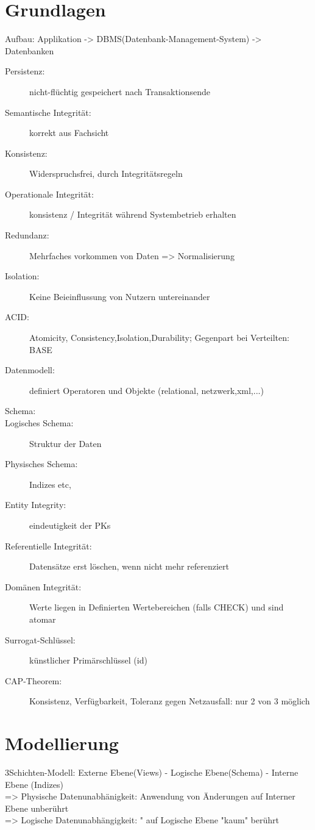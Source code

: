 \section*{Grundlagen}
Aufbau: Applikation -> DBMS(Datenbank-Management-System) -> Datenbanken

\begin{description}
\item[Persistenz:] nicht-flüchtig gespeichert nach Transaktionsende
\item[Semantische Integrität:] korrekt aus Fachsicht 
\item[Konsistenz:] Widerspruchsfrei, durch Integritätsregeln
\item[Operationale Integrität:] konsistenz / Integrität während Systembetrieb erhalten
\item[Redundanz:] Mehrfaches vorkommen von Daten => Normalisierung
\item[Isolation:] Keine Beieinflussung von Nutzern untereinander
\item[ACID:] Atomicity, Consistency,Isolation,Durability; Gegenpart bei Verteilten: BASE
\item[Datenmodell:] definiert Operatoren und Objekte (relational, netzwerk,xml,...)
\item[Schema:]
\item[Logisches Schema:] Struktur der Daten
\item[Physisches Schema:] Indizes etc,
\item[Entity Integrity:] eindeutigkeit der PKs
\item[Referentielle Integrität:] Datensätze erst löschen, wenn nicht mehr referenziert
\item[Domänen Integrität:] Werte liegen in Definierten Wertebereichen (falls CHECK) und sind atomar
\item[Surrogat-Schlüssel:] künstlicher Primärschlüssel (id)
\item[ CAP-Theorem:] Konsistenz, Verfügbarkeit, Toleranz gegen Netzausfall: nur 2 von 3 möglich

\end{description}

\section*{Modellierung}

3Schichten-Modell: Externe Ebene(Views) - Logische Ebene(Schema) - Interne Ebene (Indizes)\\
=> Physische Datenunabhänigkeit: Anwendung von Änderungen auf Interner Ebene unberührt\\
=> Logische Datenunabhängigkeit: " auf Logische Ebene "kaum" berührt

